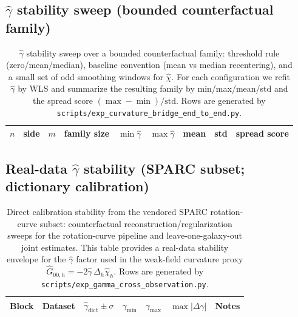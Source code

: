 \subsection{$\widehat\gamma$ stability sweep (bounded counterfactual family)}



\begin{table}[H]
\centering
\scriptsize
\setlength{\tabcolsep}{4pt}
\renewcommand{\arraystretch}{1.15}
\begin{tabular}{r r r r r r r r r}
\toprule
$n$ & side & $m$ & family size & $\min\widehat\gamma$ & $\max\widehat\gamma$ & mean & std & spread score \\
\midrule
%
\end{tabular}
\caption{$\widehat\gamma$ stability sweep over a bounded counterfactual family: threshold rule (zero/mean/median), baseline convention (mean vs median recentering), and a small set of odd smoothing windows for $\widehat\chi$. For each configuration we refit $\widehat\gamma$ by WLS and summarize the resulting family by min/max/mean/std and the spread score $(\max-\min)/\mathrm{std}$. Rows are generated by \texttt{scripts/exp\_curvature\_bridge\_end\_to\_end.py}.}
\label{tab:curvature_e2e_gamma_stability}
\end{table}

\subsection{Real-data $\widehat\gamma$ stability (SPARC subset; dictionary calibration)}

\begin{table}[H]
\centering
\scriptsize
\setlength{\tabcolsep}{6pt}
\renewcommand{\arraystretch}{1.15}
\begin{tabular}{llllllp{7.2cm}}
\toprule
Block & Dataset & $\widehat\gamma_{\mathrm{dict}} \pm \sigma$ & $\gamma_{\min}$ & $\gamma_{\max}$ & $\max|\Delta\gamma|$ & Notes \\
\midrule
%
\end{tabular}
\caption{Direct calibration stability from the vendored SPARC rotation-curve subset: counterfactual reconstruction/regularization sweeps for the rotation-curve pipeline and leave-one-galaxy-out joint estimates. This table provides a real-data stability envelope for the $\widehat\gamma$ factor used in the weak-field curvature proxy $\widehat G_{00,h}=-2\widehat\gamma\,\Delta_h\widehat\chi_h$. Rows are generated by \texttt{scripts/exp\_gamma\_cross\_observation.py}.}
\label{tab:curvature_gamma_direct_stability_realdata}
\end{table}

